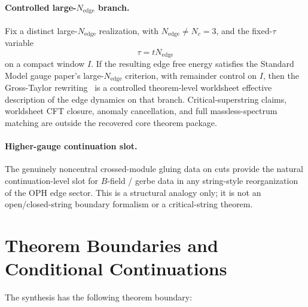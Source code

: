 \paragraph{Controlled large-\(N_{\mathrm{edge}}\) branch.}
Fix a distinct large-\(N_{\mathrm{edge}}\) realization, with \(N_{\mathrm{edge}}\neq N_c=3\), and
the fixed-\(\tau\) variable
\[
\tau=tN_{\mathrm{edge}}
\]
on a compact window \(I\). If the resulting edge free energy satisfies the Standard Model gauge paper's
large-\(N_{\mathrm{edge}}\) criterion, with remainder control on \(I\), then the Gross-Taylor
rewriting~\cite{grossTaylor93} is a controlled theorem-level worldsheet effective description of
the edge dynamics on that branch. Critical-superstring claims, worldsheet CFT closure, anomaly
cancellation, and full massless-spectrum matching are outside the recovered core theorem package.

\paragraph{Higher-gauge continuation slot.}
The genuinely noncentral crossed-module gluing data on cuts provide the natural continuation-level
slot for \(B\)-field / gerbe data in any string-style reorganization of the OPH edge sector. This
is a structural analogy only; it is not an open/closed-string boundary formalism or a
critical-string theorem.

\section{Theorem Boundaries and Conditional Continuations}

The synthesis has the following theorem boundary:

